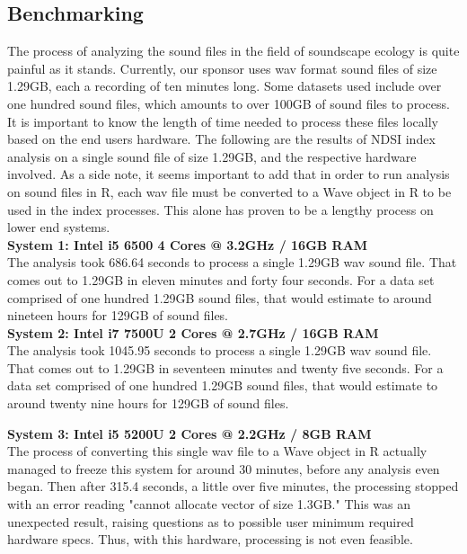 \subsection{Benchmarking}
The process of analyzing the sound files in the field of soundscape ecology is quite painful as it stands. Currently, our sponsor uses wav format sound files of size 1.29GB, each a recording of ten minutes long. Some datasets used include over one hundred sound files, which amounts to over 100GB of sound files to process. It is important to know the length of time needed to process these files locally based on the end user\textquotesingle s hardware. The following are the results of NDSI index analysis on a single sound file of size 1.29GB, and the respective hardware involved. As a side note, it seems important to add that in order to run analysis on sound files in R, each wav file must be converted to a Wave object in R to be used in the index processes. This alone has proven to be a lengthy process on lower end systems.\\

\noindent\textbf{System 1: Intel i5 6500 4 Cores @ 3.2GHz / 16GB RAM}\\
The analysis took 686.64 seconds to process a single 1.29GB wav sound file. That comes out to 1.29GB in eleven minutes and forty four seconds. For a data set comprised of one hundred 1.29GB sound files, that would estimate to around nineteen hours for 129GB of sound files.\\

\noindent\textbf{System 2: Intel i7 7500U 2 Cores @ 2.7GHz / 16GB RAM}\\
The analysis took 1045.95 seconds to process a single 1.29GB wav sound file. That comes out to 1.29GB in seventeen minutes and twenty five seconds. For a data set comprised of one hundred 1.29GB sound files, that would estimate to around twenty nine hours for 129GB of sound files.

\noindent\textbf{System 3: Intel i5 5200U 2 Cores @ 2.2GHz / 8GB RAM}\\
The process of converting this single wav file to a Wave object in R actually managed to freeze this system for around 30 minutes, before any analysis even began. Then after 315.4 seconds, a little over five minutes, the processing stopped with an error reading "cannot allocate vector of size 1.3GB." This was an unexpected result, raising questions as to possible user minimum required hardware specs. Thus, with this hardware, processing is not even feasible.\\

